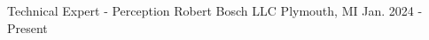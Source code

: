 

\begin{cventries}

  \cventry
    {Technical Expert - Perception} %
    {Robert Bosch LLC} %
    {Plymouth, MI} %
    {Jan. 2024 - Present} %
    {
    }


\end{cventries}
